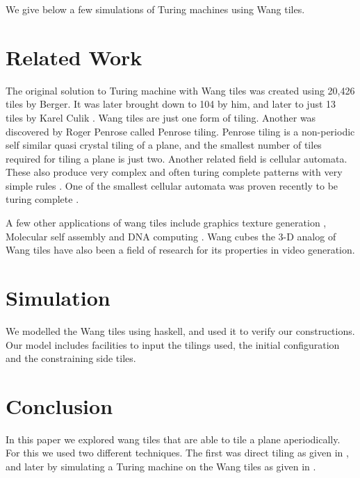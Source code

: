 \documentclass{article}
\begin{document}
We give below a few simulations of Turing machines using Wang tiles.

\section*{Related Work}
The original solution to Turing machine with Wang tiles was created using 20,426 tiles by Berger. It was later brought down to 104 by him, and later to just 13 tiles by Karel Culik \cite{culik}. Wang tiles are just one form of tiling. Another was discovered by Roger Penrose called Penrose tiling. Penrose tiling \cite{penrose} is a non-periodic self similar quasi crystal tiling of a plane, and the smallest number of tiles required for tiling a plane is just two. Another related field is cellular automata. These also produce very complex and often turing complete patterns with very simple rules \cite{wolfram}. One of the smallest cellular automata was proven recently to be turing complete \cite{cook}.

A few other applications of wang tiles include graphics texture generation \cite{texture}, Molecular self assembly \cite{assembly} and DNA computing \cite{dna}. Wang cubes \cite{cubes} the 3-D analog of Wang tiles have also been a field of research for its properties in video generation.

\section*{Simulation}
We modelled the Wang tiles using haskell, and used it to verify our constructions. Our model includes facilities to input the tilings used, the initial configuration and the constraining side tiles. 

\section*{Conclusion}
In this paper we explored wang tiles that are able to tile a plane aperiodically. For this we used two different techniques. The first was direct tiling as given in \cite{tilings}, and later by simulating a Turing machine on the Wang tiles as given in \cite{tmtiles}.

\end{document}
